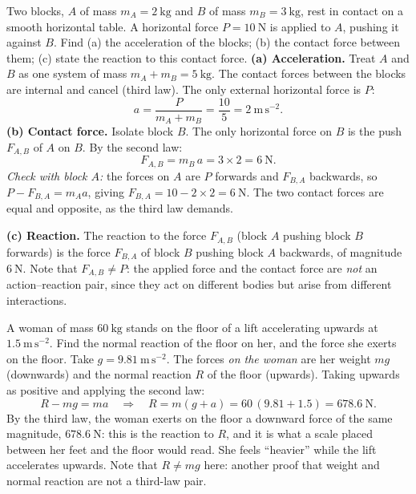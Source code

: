 \documentclass[11pt]{article}
\begin{document}
\begin{exoresolu}
Two blocks, $A$ of mass $m_A = 2\ \mathrm{kg}$ and $B$ of mass $m_B = 3\ \mathrm{kg}$, rest in contact on a smooth horizontal table. A horizontal force $P = 10\ \mathrm{N}$ is applied to $A$, pushing it against $B$. Find (a) the acceleration of the blocks; (b) the contact force between them; (c) state the reaction to this contact force.
\tcblower
\textbf{(a) Acceleration.} Treat $A$ and $B$ as one system of mass $m_A + m_B = 5\ \mathrm{kg}$. The contact forces between the blocks are internal and cancel (third law). The only external horizontal force is $P$:
\[
a = \frac{P}{m_A + m_B} = \frac{10}{5} = 2\ \mathrm{m\,s^{-2}}.
\]
\textbf{(b) Contact force.} Isolate block $B$. The only horizontal force on $B$ is the push $F_{A,B}$ of $A$ on $B$. By the second law:
\[
F_{A,B} = m_B\, a = 3 \times 2 = 6\ \mathrm{N}.
\]
\emph{Check with block $A$:} the forces on $A$ are $P$ forwards and $F_{B,A}$ backwards, so $P - F_{B,A} = m_A a$, giving $F_{B,A} = 10 - 2\times 2 = 6\ \mathrm{N}$. The two contact forces are equal and opposite, as the third law demands.
\par\smallskip
\textbf{(c) Reaction.} The reaction to the force $F_{A,B}$ (block $A$ pushing block $B$ forwards) is the force $F_{B,A}$ of block $B$ pushing block $A$ backwards, of magnitude $6\ \mathrm{N}$. Note that $F_{A,B} \neq P$: the applied force and the contact force are \emph{not} an action--reaction pair, since they act on different bodies but arise from different interactions.
\end{exoresolu}

\begin{exoresolu}
A woman of mass $60\ \mathrm{kg}$ stands on the floor of a lift accelerating upwards at $1.5\ \mathrm{m\,s^{-2}}$. Find the normal reaction of the floor on her, and the force she exerts on the floor. Take $g = 9.81\ \mathrm{m\,s^{-2}}$.
\tcblower
The forces \emph{on the woman} are her weight $mg$ (downwards) and the normal reaction $R$ of the floor (upwards). Taking upwards as positive and applying the second law:
\[
R - mg = ma \quad\Longrightarrow\quad R = m(g+a) = 60\,(9.81 + 1.5) = 678.6\ \mathrm{N}.
\]
By the third law, the woman exerts on the floor a downward force of the same magnitude, $678.6\ \mathrm{N}$: this is the reaction to $R$, and it is what a scale placed between her feet and the floor would read. She feels ``heavier'' while the lift accelerates upwards. Note that $R \neq mg$ here: another proof that weight and normal reaction are not a third-law pair.
\end{exoresolu}
\end{document}
